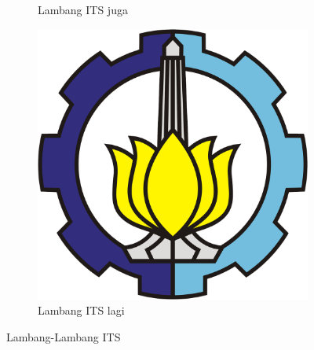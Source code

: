 {\begin{figure}
\begin{subfigure}[b]{0.3\textwidth}
            \caption{Lambang ITS juga}
            \label{fig:lambang its b}
        \end{subfigure}
        \begin{subfigure}[b]{0.3\textwidth}
            \centering
            \includegraphics[width=\textwidth]{src/image/its-lambang.png}
            \caption{Lambang ITS lagi}
            \label{fig:lambang its c}
        \end{subfigure}
        \caption{Lambang-Lambang ITS}
        \label{fig:lambang its semua}
    \end{figure}    
}

